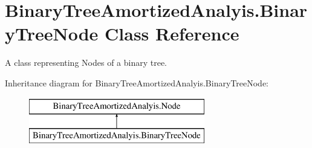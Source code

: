 \hypertarget{class_binary_tree_amortized_analyis_1_1_binary_tree_node}{}\section{Binary\+Tree\+Amortized\+Analyis.\+Binary\+Tree\+Node Class Reference}
\label{class_binary_tree_amortized_analyis_1_1_binary_tree_node}


A class representing Nodes of a binary tree.  


Inheritance diagram for Binary\+Tree\+Amortized\+Analyis.\+Binary\+Tree\+Node\+:\begin{figure}[H]
\begin{center}
\leavevmode
\includegraphics[height=2.000000cm]{class_binary_tree_amortized_analyis_1_1_binary_tree_node}
\end{center}
\end{figure}
